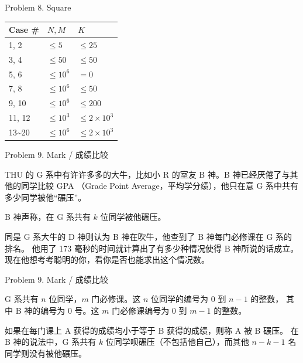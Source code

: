 \documentclass[UTF8]{beamer}
\begin{document}
\begin{frame}{Problem 8. Square}

\begin{tabularx}{\textwidth}{X|X|X} \hline
Case \# & $N, M$ & $K$ \\ \hline \hline
1, 2   & $\leq 5$    & $\leq 25$            \\ \hline
3, 4   & $\leq 50$   & $\leq 50$            \\ \hline
5, 6   & $\leq 10^6$ & $= 0$                \\ \hline
7, 8   & $\leq 10^6$ & $\leq 50$            \\ \hline
9, 10  & $\leq 10^6$ & $\leq 200$           \\ \hline
11, 12 & $\leq 10^3$ & $\leq 2 \times 10^3$ \\ \hline
13\textasciitilde 20 & $\leq 10^6$ & $\leq 2 \times 10^3$ \\ \hline
\end{tabularx}

\end{frame}


\begin{frame}{Problem 9. Mark / 成绩比较}

THU 的 G 系中有许许多多的大牛，比如小 R 的室友 B 神。B 神已经厌倦了与其他的同学比较 GPA
（Grade Point Average，平均学分绩），他只在意 G 系中共有多少同学被他“碾压”。

B 神声称，在 G 系共有 $k$ 位同学被他碾压。

同是 G 系大牛的 D 神则认为 B 神在吹牛，他查到了 B 神每门必修课在 G 系的排名。
他用了 173 毫秒的时间就计算出了有多少种情况使得 B 神所说的话成立。
现在他想考考聪明的你，看你是否也能求出这个情况数。

\end{frame}

\begin{frame}{Problem 9. Mark / 成绩比较}

G 系共有 $n$ 位同学，$m$ 门必修课。这 $n$ 位同学的编号为 0 到 $n - 1$ 的整数，
其中 B 神的编号为 0 号。这 $m$ 门必修课编号为 0 到 $m - 1$ 的整数。

如果在每门课上 A 获得的成绩均小于等于 B 获得的成绩，则称 A 被 B 碾压。
在 B 神的说法中，G 系共有 $k$ 位同学呗碾压（不包括他自己），而其他 $n - k - 1$
名同学则没有被他碾压。

\end{frame}
\end{document}
